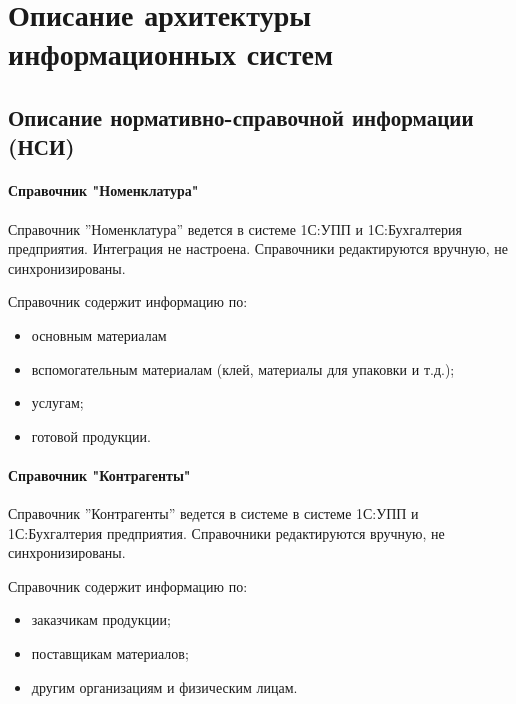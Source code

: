 
\newpage

\chapter{Описание архитектуры информационных систем}




\section{Описание нормативно-справочной информации (НСИ)}

\subsubsection{Справочник "Номенклатура"}

Справочник ”Номенклатура” ведется в системе 1С:УПП и 1С:Бухгалтерия предприятия.
Интеграция не настроена. Справочники редактируются вручную, не синхронизированы.



Справочник содержит информацию по:
\begin{itemize}
\item основным материалам %
\item вспомогательным материалам (клей, материалы для упаковки и т.д.);
\item услугам;
\item готовой продукции.
\end{itemize}

\subsubsection{Справочник "Контрагенты"}

Справочник ”Контрагенты” ведется в системе в системе 1С:УПП и 1С:Бухгалтерия предприятия.
Справочники редактируются вручную, не синхронизированы.

Справочник содержит информацию по:

\begin{itemize}
\item заказчикам продукции;
\item поставщикам материалов;
\item другим организациям и физическим лицам.
\end{itemize}


